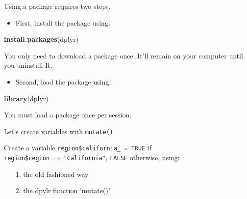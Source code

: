\documentclass[ignorenonframetext,]{beamer}
\newenvironment{Shaded}{\begin{snugshade}}{\end{snugshade}}
\newcommand{\KeywordTok}[1]{\textcolor[rgb]{0.13,0.29,0.53}{\textbf{#1}}}
\newcommand{\StringTok}[1]{\textcolor[rgb]{0.31,0.60,0.02}{#1}}
\newcommand{\CommentTok}[1]{\textcolor[rgb]{0.56,0.35,0.01}{\textit{#1}}}
\newcommand{\OperatorTok}[1]{\textcolor[rgb]{0.81,0.36,0.00}{\textbf{#1}}}
\newcommand{\NormalTok}[1]{#1}
\providecommand{\tightlist}{%
	\setlength{\itemsep}{0pt}\setlength{\parskip}{0pt}}
\begin{document}
\begin{frame}[fragile]{Using a package requires two steps.}

\begin{itemize}
\tightlist
\item
  First, install the package using:
\end{itemize}

\begin{Shaded}
\begin{Highlighting}[]
\KeywordTok{install.packages}\NormalTok{(dplyr)}
\end{Highlighting}
\end{Shaded}

You only need to download a package once. It'll remain on your computer
until you uninstall R.

\begin{itemize}
\tightlist
\item
  Second, load the package using:
\end{itemize}

\begin{Shaded}
\begin{Highlighting}[]
\KeywordTok{library}\NormalTok{(dplyr)}
\end{Highlighting}
\end{Shaded}

You must load a package once per session.

\end{frame}

\begin{frame}[fragile]{Let's create variables with \texttt{mutate()}}

Create a variable \texttt{region\$california\_\ =\ TRUE} if
\texttt{region\$region\ ==\ "California"}, \texttt{FALSE} otherwise,
using:

\begin{enumerate}
\def\labelenumi{\arabic{enumi}.}
\tightlist
\item[1.]
  the old fashioned way
\item[2.]
  the dpylr function `mutate()'
\end{enumerate}

\begin{Shaded}
\end{Shaded}

\end{frame}
\end{document}
